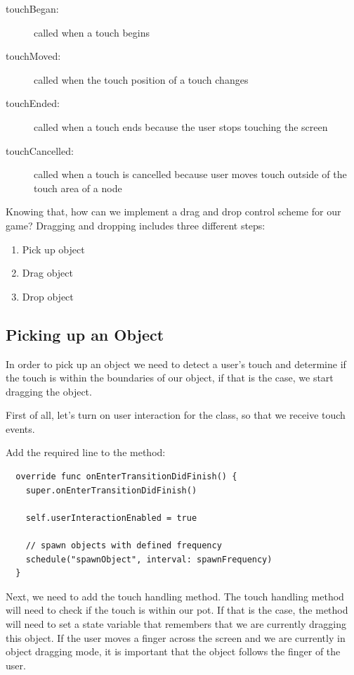 \begin{description}
\item[touchBegan:] called when a touch begins
\item[touchMoved:] called when the touch position of a touch changes
\item[touchEnded:] called when a touch ends because the user stops touching the
screen
\item[touchCancelled:] called when a touch is cancelled because user moves touch
outside of the touch area of a node
\end{description}

Knowing that, how can we implement a drag and drop control scheme for our game?
Dragging and dropping includes three different steps:
\begin{enumerate}
  \item Pick up object
  \item Drag object
  \item Drop object
\end{enumerate}

\subsection{Picking up an Object}
In order to pick up an object we need to detect a user's touch and determine if
the touch is within the boundaries of our object, if that is the case,
we start dragging the object.

First of all, let's turn on user interaction for the 
class, so that we receive touch events.

\begin{leftbar}
Add the required line to the  method:
\begin{lstlisting}
  override func onEnterTransitionDidFinish() {
    super.onEnterTransitionDidFinish()
    
    self.userInteractionEnabled = true
    
    // spawn objects with defined frequency
    schedule("spawnObject", interval: spawnFrequency)
  }
\end{lstlisting}
\end{leftbar}

Next, we need to add the touch handling method. The touch handling method will
need to check if the touch is within our pot. If that is the case, the method
will need to set a state variable that remembers that we are currently dragging
this object. If the user moves a finger across the screen and we are currently
in object dragging mode, it is important that the object follows the finger of
the user.

